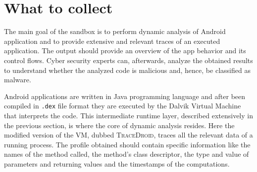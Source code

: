 \section{What to collect}
\label{sec:scope_design}

The main goal of the sandbox is to perform dynamic analysis of Android
application and to provide extensive and relevant traces of an
executed application. The output should provide an overview of the app
behavior and its control flows. Cyber security experts can,
afterwards, analyze the obtained results to understand whether the
analyzed code is malicious and, hence, be classified as malware.

Android applications are written in Java programming language and
after been compiled in \texttt{.dex} file format they are executed by the
Dalvik Virtual Machine that interprets the code. This intermediate
runtime layer, described extensively in the previous section, is where
the core of dynamic analysis resides. Here the modified version of the
VM, dubbed \textsc{TraceDroid}, traces all the relevant data of a running
process. The profile obtained should contain specific information like
the names of the method called, the method's class descriptor, the
type and value of parameters and returning values and the timestamps
of the computations.
